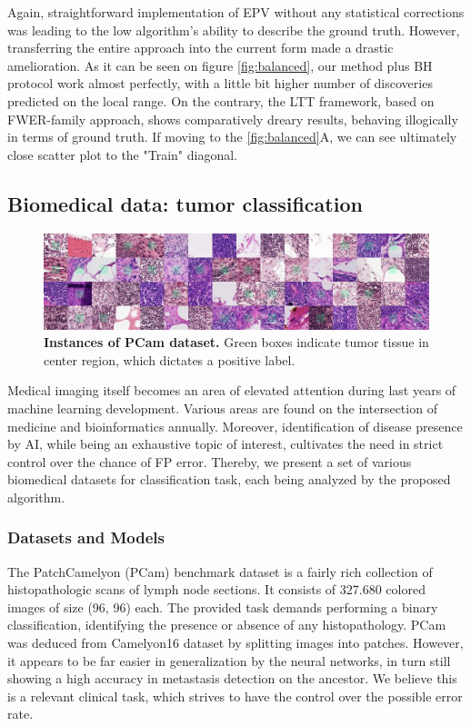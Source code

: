 \documentclass{article}
\begin{document}
Again, straightforward implementation of EPV without any statistical corrections was leading to the low algorithm's ability to describe the ground truth. However, transferring the entire approach into the current form made a drastic amelioration. As it can be seen on figure \ref{fig:balanced}, our method plus BH protocol work almost perfectly, with a little bit higher number of discoveries predicted on the local range. On the contrary, the LTT framework, based on FWER-family approach, shows comparatively dreary results, behaving illogically in terms of ground truth. If moving to the \ref{fig:balanced}A, we can see ultimately close scatter plot to the "Train" diagonal.

\subsection{Biomedical data: tumor classification}

\begin{figure}
	\centering
	\includegraphics[width=6in]{img/pcam_example.png}
	\caption{{\bf Instances of PCam dataset.} Green boxes indicate tumor tissue in center region, which dictates a positive label.}
	\label{fig:pcam_example}
\end{figure} 

Medical imaging itself becomes an area of elevated attention during last years of machine learning development. Various areas are found on the intersection of medicine and bioinformatics annually. Moreover, identification of disease presence by AI, while being an exhaustive topic of interest, cultivates the need in strict control over the chance of FP error. Thereby, we present a set of various biomedical datasets for classification task, each being analyzed by the proposed algorithm.

\subsubsection{Datasets and Models}

The PatchCamelyon (PCam) benchmark dataset is a fairly rich collection of histopathologic scans of lymph node sections. It consists of 327.680 colored images of size (96, 96) each. The provided task demands performing a binary classification, identifying the presence or absence of any histopathology. PCam was deduced from Camelyon16 dataset by splitting images into patches. However, it appears to be far easier in generalization by the neural networks, in turn still showing a high accuracy in metastasis detection on the ancestor. We believe this is a relevant clinical task, which strives to have the control over the possible error rate.
\end{document}
